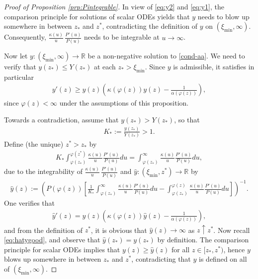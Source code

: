 \documentclass[reqno]{amsart}
\newcommand{\setR}{\mathbb{R}}
\newcommand{\R}{\mathbb{R}}
\begin{document}
\begin{proof}[Proof of Proposition \ref{prp:Pintegrable}]
   In view of \eqref{eq:y2} and \eqref{eq:y1}, the comparison principle for solutions of scalar ODEs yields that $y$ needs to blow up somewhere in between $z_*$ and $z^*$, contradicting the definition of $y$ on $(\xi_{\min},\infty)$.
   Consequently, $\frac{\kappa(u)}{u}\,\frac{P'(u)}{P(u)}$ needs to be integrable at $u\to\infty$.
   
   Now let $y:(\xi_{\min},\infty)\to\R$ be a non-negative solution to \eqref{cond-aa}. We need to verify that $y(z_*)\le Y(z_*)$ at each $z_*>\xi_{\min}$. 
    Since $y$ is admissible, it satisfies in particular
    \begin{align}
        \label{eq:hatygood}
        y'(z) \ge y(z)\left(\kappa(\varphi(z))y(z)-\frac1{\alpha(\varphi(z))}\right),
    \end{align}
    since $\varphi(z)<\infty$ under the assumptions of this proposition.  
    
    Towards a contradiction, assume that $y(z_*)>Y(z_*)$, so that
    \begin{align*}
        K_*:=\frac{y(z_*)}{Y(z_*)}>1.
    \end{align*}
    Define (the unique) $z^*>z_*$ by
    \begin{align*}
        K_*\int_{\varphi(z_*)}^{\varphi(z^*)}\frac{\kappa(u)}{u}\frac{P'(u)}{P(u)}du
        =\int_{\varphi(z_*)}^{\infty}\frac{\kappa(u)}{u}\frac{P'(u)}{P(u)}du,
    \end{align*}
    due to the integrability of $\frac{\kappa(u)}{u}\,\frac{P'(u)}{P(u)}$ and $\hat y:(\xi_{\min},z^*)\to\setR$ by
    \begin{align*}
        \hat y(z) :=\left(P(\varphi(z))\left[
        \frac1{K_*}\int_{\varphi(z_*)}^{\infty}\frac{\kappa(u)}{u}\frac{P'(u)}{P(u)}du
        -\int_{\varphi(z_*)}^{\varphi(z)}\frac{\kappa(u)}{u}\frac{P'(u)}{P(u)}du
        \right]\right)^{-1}.
    \end{align*}
    One verifies that
    \begin{align*}
        \hat y'(z) = \hat y(z)\left(\kappa(\varphi(z))\hat y(z)-\frac1{\alpha(\varphi(z))}\right),
    \end{align*}
    and from the definition of $z^*$, it is obvious that $\hat y(z)\to\infty$ as $z\uparrow z^*$.
    Now recall \eqref{eq:hatygood}, and observe that $\hat y(z_*)=y(z_*)$ by definition. The comparison principle for scalar ODEs implies that $y(z)\ge\hat y(z)$ for all $z\in[z_*,z^*)$, hence $y$ blows up somewhere in between $z_*$ and $z^*$, contradicting that $y$ is defined on all of $(\xi_{\min},\infty)$.
\end{proof}
\end{document}
